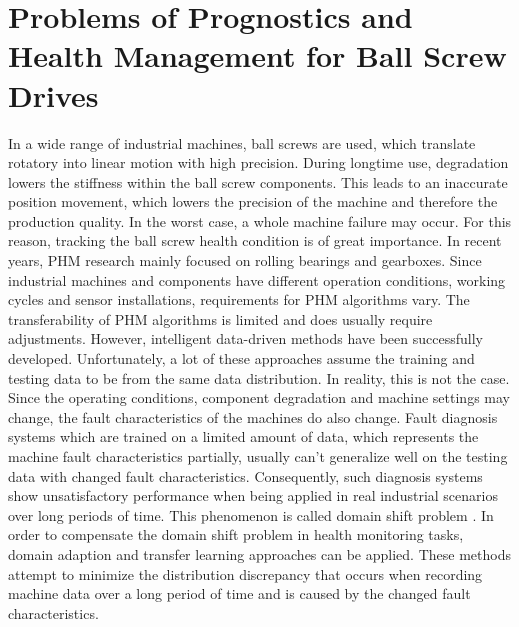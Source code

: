 \section{Problems of Prognostics and Health Management for Ball Screw Drives}
In a wide range of industrial machines, ball screws are used, which translate rotatory into linear motion with high precision. During longtime use, degradation lowers the stiffness within the ball screw components. This leads to an inaccurate position movement, which lowers the precision of the machine and therefore the production quality. In the worst case, a whole machine failure may occur. For this reason, tracking the ball screw health condition is of great importance. In recent years, PHM research mainly focused on rolling bearings and gearboxes. Since industrial machines and components have different operation conditions, working cycles and sensor installations, requirements for PHM algorithms vary. The transferability of PHM algorithms is limited and does usually require adjustments. However, intelligent data-driven methods have been successfully developed. Unfortunately, a lot of these approaches assume the training and testing data to be from the same data distribution. In reality, this is not the case. Since the operating conditions, component degradation and machine settings may change, the fault characteristics of the machines do also change. Fault diagnosis systems which are trained on a limited amount of data, which represents the machine fault characteristics partially, usually can't generalize well on the testing data with changed fault characteristics. Consequently, such diagnosis systems show unsatisfactory performance when being applied in real industrial scenarios over long periods of time. This phenomenon is called domain shift problem \cite{AZAMFAR2020103932}. In order to compensate the domain shift problem in health monitoring tasks, domain adaption and transfer learning approaches can be applied. These methods attempt to minimize the distribution discrepancy that occurs when recording machine data over a long period of time and is caused by the changed fault characteristics. 

